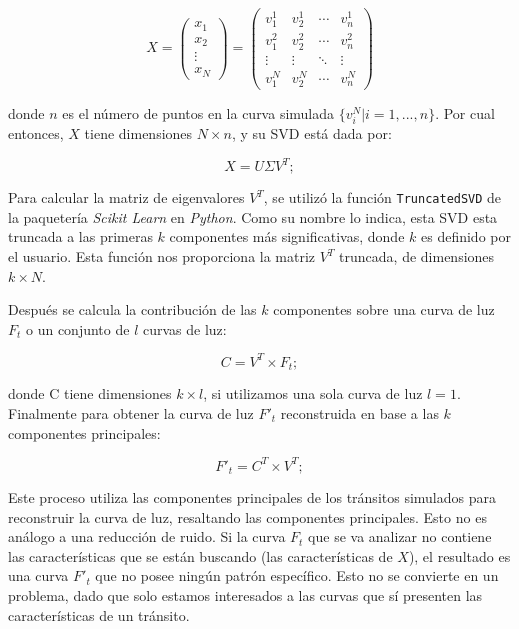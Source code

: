 \begin{equation}
  X = 
  \begin{pmatrix}
  x_{1} \\
  x_{2}\\
  \vdots  \\
  x_{N}
  \end{pmatrix}=
  \begin{pmatrix}
    v^{1}_{1} & v^{1}_{2} & \cdots & v^{1}_{n} \\
    v^{2}_{1} & v^{2}_{2} & \cdots & v^{2}_{n} \\
    \vdots  & \vdots  & \ddots & \vdots  \\
    v^{N}_{1} & v^{N}_{2} & \cdots & v^{N}_{n} 
  \end{pmatrix}
\end{equation}

donde $n$ es el número de puntos en la curva simulada $\{v^{N}_{i}|i=1,...,n\}$. Por cual entonces, $X$ tiene dimensiones $N\times n$, y su SVD  está dada por:

\begin{equation}
  \displaystyle X=U\Sigma V^{T};
\end{equation}

Para calcular la matriz de eigenvalores $V^{T}$, se utilizó la función \texttt{TruncatedSVD} de la paquetería \textit{Scikit Learn} en \textit{Python}. Como su nombre lo indica, esta SVD esta truncada a las primeras $k$ componentes más significativas, donde $k$  es definido por el usuario. Esta función nos proporciona la matriz $V^{T}$ truncada, de dimensiones $k\times N$.

Después se calcula la contribución de las $k$ componentes sobre una curva de luz $F_{t}$ o un conjunto de $l$ curvas de luz:

\begin{equation}
  \displaystyle C=V^{T} \times F_{t};
\end{equation}

donde C tiene dimensiones $k\times l$, si utilizamos una sola curva de luz $l=1$. Finalmente para obtener la curva de luz $F'_{t}$ reconstruida en base a las $k$ componentes principales:

\begin{equation}
  \displaystyle F'_{t}=C^{T} \times V^{T};
\end{equation}

Este proceso utiliza las componentes principales de los tránsitos simulados para reconstruir la curva de luz, resaltando las componentes principales. Esto no es análogo a una reducción de ruido. Si la curva $F_{t}$ que se va analizar no contiene las características que se están buscando (las características de $X$), el resultado es una curva $F'_{t}$ que no posee ningún patrón específico. Esto no se convierte en un problema, dado que solo estamos interesados a las curvas que sí presenten las características de un tránsito.


